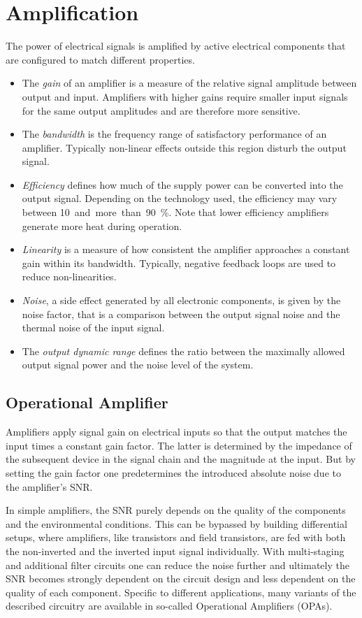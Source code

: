 \section{Amplification}

The power of electrical signals is amplified by active electrical components that are configured to match different properties.
\begin{itemize}
  \item The \emph{gain} of an amplifier is a measure of the relative signal amplitude between output and input. Amplifiers with higher gains require smaller input signals for the same output amplitudes and are therefore more sensitive.
  \item The \emph{bandwidth} is the frequency range of satisfactory performance of an amplifier. Typically non-linear effects outside this region disturb the output signal.
  \item \emph{Efficiency} defines how much of the supply power can be converted into the output signal. Depending on the technology used, the efficiency may vary between 10~and~more~than~\SI{90}{\percent}. Note that lower efficiency amplifiers generate more heat during operation.
  \item \emph{Linearity} is a measure of how consistent the amplifier approaches a constant gain within its bandwidth. Typically, negative feedback loops are used to reduce non-linearities.
  \item \emph{Noise}, a side effect generated by all electronic components, is given by the noise factor, that is a comparison between the output signal noise and the thermal noise of the input signal.
  \item The \emph{output dynamic range} defines the ratio between the maximally allowed output signal power and the noise level of the system.
\end{itemize}

\subsection{Operational Amplifier}

Amplifiers apply signal gain on electrical inputs so that the output matches the input times a constant gain factor. The latter is determined by the impedance of the subsequent device in the signal chain and the magnitude at the input. But by setting the gain factor one predetermines the introduced absolute noise due to the amplifier's \ac{SNR}.

In simple amplifiers, the \ac{SNR} purely depends on the quality of the components and the environmental conditions. This can be bypassed by building differential setups, where amplifiers, like transistors and field transistors, are fed with both the non-inverted and the inverted input signal individually. With multi-staging and additional filter circuits one can reduce the noise further and ultimately the \ac{SNR} becomes strongly dependent on the circuit design and less dependent on the quality of each component. Specific to different applications, many variants of the described circuitry are available in so-called Operational Amplifiers (\acs{OPA}s).

